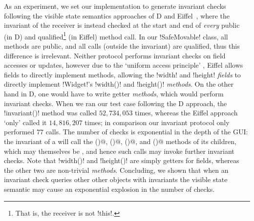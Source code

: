As an experiment, we set our implementation to generate invariant checks following the  visible state semantics approaches of D and Eiffel~\cite{Alexandrescu:2010:DPL:1875434,DRef},
where the invariant of the receiver is instead checked at the start and end of \emph{every} 
public (in D) and qualified\footnote{That is, the receiver is not \Q!this!.} (in Eiffel) method call.
In our \Q!SafeMovable! class, all methods are public, and all calls (outside the invariant) are qualified, thus this difference is irrelevant. Neither protocol performs invariant checks on field accesses or updates,
however due to the `uniform access principle'\cite{?}%
, Eiffel allows fields to directly implement methods,
 allowing the \Q!width! and \Q!height! \emph{fields} to directly implement \Q!Widget!'s \Q!width()! and \Q!height()! \emph{methods}. On the other hand in D, one would have to write getter \emph{methods}, which would perform invariant checks.
When we ran our test case following the D approach, the \Q!invariant()! method was called $52,734,053$ times, whereas the Eiffel approach `only' called it $14,816,207$ times; %
in comparison our invariant protocol only performed $77$ calls. The number of checks is exponential in the depth of the GUI: the invariant of a \Q@SafeMovable@ will call the \Q@width()@, \Q@height()@, \Q@left()@, and \Q@top()@ methods of its children, which may themselves be \Q@SafeMovable@s, and hence such calls may invoke further invariant checks. Note that \Q!width()! and \Q!height()! are simply getters for fields, whereas the other two are non-trivial \emph{methods}.
Concluding, we shown that when an invariant check queries other other objects with invariants the visible state semantic may cause an exponential explosion in the number of checks.

